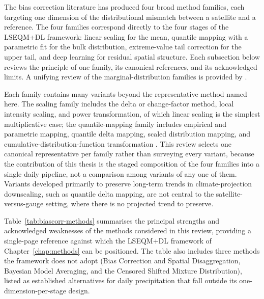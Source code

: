 The bias correction literature has produced four broad method
families, each targeting one dimension of the distributional
mismatch between a satellite and a reference. The four families
correspond directly to the four stages of the LSEQM+DL framework:
linear scaling for the mean, quantile mapping with a parametric
fit for the bulk distribution, extreme-value tail correction for
the upper tail, and deep learning for residual spatial structure.
Each subsection below reviews the principle of one family, its
canonical references, and its acknowledged limits. A unifying
review of the marginal-distribution families is provided by
\citet{ref:maraun2016}.

Each family contains many variants beyond the representative method
named here. The scaling family includes the delta or change-factor
method, local intensity scaling, and power transformation, of which
linear scaling is the simplest multiplicative case; the
quantile-mapping family includes empirical and parametric mapping,
quantile delta mapping, scaled distribution mapping, and
cumulative-distribution-function transformation
\citep{ref:gudmundsson2012, ref:teutschbein2012, ref:cannon2015}. This
review selects one canonical representative per family rather than
surveying every variant, because the contribution of this thesis is
the staged composition of the four families into a single daily
pipeline, not a comparison among variants of any one of them. Variants
developed primarily to preserve long-term trends in climate-projection
downscaling, such as quantile delta mapping, are not central to the
satellite-versus-gauge setting, where there is no projected trend to
preserve.

Table~\ref{tab:biascorr-methods} summarises the principal
strengths and acknowledged weaknesses of the methods considered
in this review, providing a single-page reference against which
the LSEQM+DL framework of Chapter~\ref{chap:methods} can be
positioned. The table also includes three methods the framework
does not adopt (Bias Correction and Spatial Disaggregation,
Bayesian Model Averaging, and the Censored Shifted Mixture
Distribution), listed as established alternatives for daily
precipitation that fall outside its one-dimension-per-stage
design.

